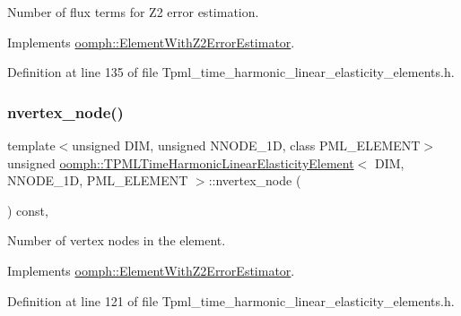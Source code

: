 Number of \textquotesingle{}flux\textquotesingle{} terms for Z2 error estimation. 



Implements \hyperlink{classoomph_1_1ElementWithZ2ErrorEstimator_ae82c5728902e13da31be19c390fc28e3}{oomph\+::\+Element\+With\+Z2\+Error\+Estimator}.



Definition at line 135 of file Tpml\+\_\+time\+\_\+harmonic\+\_\+linear\+\_\+elasticity\+\_\+elements.\+h.

\mbox{\label{classoomph_1_1TPMLTimeHarmonicLinearElasticityElement_ac58c850dc51484b11de1b2ae07c3f1ea}} 
\subsubsection{\texorpdfstring{nvertex\+\_\+node()}{nvertex\_node()}}
{\footnotesize\ttfamily template$<$unsigned D\+IM, unsigned N\+N\+O\+D\+E\+\_\+1D, class P\+M\+L\+\_\+\+E\+L\+E\+M\+E\+NT$>$ \\
unsigned \hyperlink{classoomph_1_1TPMLTimeHarmonicLinearElasticityElement}{oomph\+::\+T\+P\+M\+L\+Time\+Harmonic\+Linear\+Elasticity\+Element}$<$ D\+IM, N\+N\+O\+D\+E\+\_\+1D, P\+M\+L\+\_\+\+E\+L\+E\+M\+E\+NT $>$\+::nvertex\+\_\+node (\begin{DoxyParamCaption}{ }\end{DoxyParamCaption}) const\hspace{0.3cm}{\ttfamily [inline]}, {\ttfamily [virtual]}}



Number of vertex nodes in the element. 



Implements \hyperlink{classoomph_1_1ElementWithZ2ErrorEstimator_a19495a0e77ef4ff35f15fdf7913b4077}{oomph\+::\+Element\+With\+Z2\+Error\+Estimator}.



Definition at line 121 of file Tpml\+\_\+time\+\_\+harmonic\+\_\+linear\+\_\+elasticity\+\_\+elements.\+h.

\mbox{\label{classoomph_1_1TPMLTimeHarmonicLinearElasticityElement_ad3808643b11b3fd8dd9618ff1fed29ce}} 

